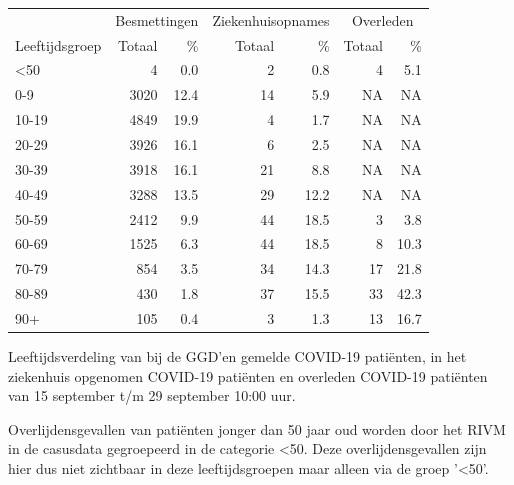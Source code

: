 \documentclass[
  english,
  man,floatsintext]{apa6}
\begin{document}
\begin{table}
\centering\begingroup\fontsize{11}{13}\selectfont

\begin{threeparttable}
\begin{tabular}{lrrrrrr}
\toprule
\multicolumn{1}{c}{ } & \multicolumn{2}{c}{Besmettingen} & \multicolumn{2}{c}{Ziekenhuisopnames} & \multicolumn{2}{c}{Overleden} \\
\cmidrule(l{3pt}r{3pt}){2-3} \cmidrule(l{3pt}r{3pt}){4-5} \cmidrule(l{3pt}r{3pt}){6-7}
Leeftijdsgroep & Totaal & \% & Totaal & \% & Totaal & \%\\
\midrule
<50 & 4 & 0.0 & 2 & 0.8 & 4 & 5.1\\
0-9 & 3020 & 12.4 & 14 & 5.9 & NA & NA\\
10-19 & 4849 & 19.9 & 4 & 1.7 & NA & NA\\
20-29 & 3926 & 16.1 & 6 & 2.5 & NA & NA\\
30-39 & 3918 & 16.1 & 21 & 8.8 & NA & NA\\
40-49 & 3288 & 13.5 & 29 & 12.2 & NA & NA\\
50-59 & 2412 & 9.9 & 44 & 18.5 & 3 & 3.8\\
60-69 & 1525 & 6.3 & 44 & 18.5 & 8 & 10.3\\
70-79 & 854 & 3.5 & 34 & 14.3 & 17 & 21.8\\
80-89 & 430 & 1.8 & 37 & 15.5 & 33 & 42.3\\
90+ & 105 & 0.4 & 3 & 1.3 & 13 & 16.7\\
\bottomrule
\end{tabular}
\begin{tablenotes}
\item[1] Leeftijdsverdeling van bij de GGD’en gemelde COVID-19 patiënten, in het ziekenhuis opgenomen COVID-19 patiënten en overleden COVID-19 patiënten van 15 september t/m 29 september 10:00 uur.
\item[2] Overlijdensgevallen van patiënten jonger dan 50 jaar oud worden door het RIVM in de casusdata gegroepeerd in de categorie <50. Deze overlijdensgevallen zijn hier dus niet zichtbaar in deze leeftijdsgroepen maar alleen via de groep '<50'.
\end{tablenotes}
\end{threeparttable}
\endgroup{}
\end{table}

\newpage
\end{document}
